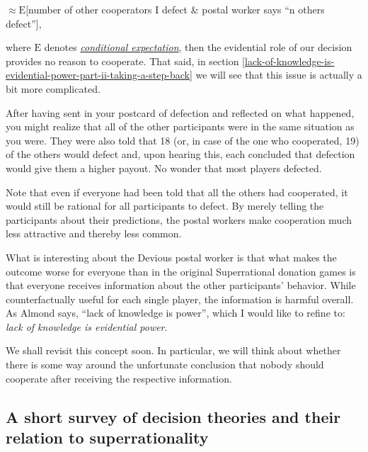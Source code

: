 $\approx \mathrm{E}${[}number of other cooperators \textbar{} I defect \& postal worker
says ``n others defect''{]},

where $\mathrm{E}$ denotes
\href{https://en.wikipedia.org/wiki/Conditional_expectation}{\emph{conditional
expectation}}, then the evidential role of our decision provides no
reason to cooperate. That said, in section
\ref{lack-of-knowledge-is-evidential-power-part-ii-taking-a-step-back} we
will see that this issue is actually a bit more complicated.

After having sent in your postcard of defection and reflected on what
happened, you might realize that all of the other participants were in
the same situation as you were. They were also told that 18 (or, in case
of the one who cooperated, 19) of the others would defect and, upon
hearing this, each concluded that defection would give them a higher
payout. No wonder that most players defected.

Note that even if everyone had been told that all the others had
cooperated, it would still be rational for all participants to defect.
By merely telling the participants about their predictions, the postal
workers make cooperation much less attractive and thereby less common.

What is interesting about the Devious postal worker is that what makes
the outcome worse for everyone than in the original Superrational
donation games is that everyone receives information about the other
participants' behavior. While counterfactually useful for each single
player, the information is harmful overall. As Almond 
\parencite{Almond2010-xn} says, ``lack of knowledge is
power'', which I would like to refine to: \emph{lack of knowledge is
evidential power}.

We shall revisit this concept soon. In particular, we will think about
whether there is some way around the unfortunate conclusion that nobody
should cooperate after receiving the respective information.

\hypertarget{a-short-survey-of-decision-theories-and-their-relation-to-superrationality}{\subsection{A
short survey of decision theories and their relation to
superrationality}\label{a-short-survey-of-decision-theories-and-their-relation-to-superrationality}}

